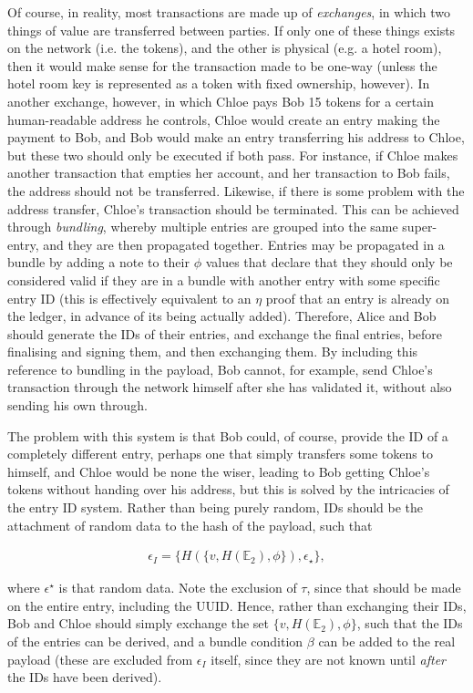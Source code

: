 \documentclass{extreport}
\begin{document}
Of course, in reality, most transactions are made up of \emph{exchanges}, in which two things of value are transferred between parties. If only one of these things exists on the network (i.e. the tokens), and the other is physical (e.g. a hotel room), then it would make sense for the transaction made to be one-way (unless the hotel room key is represented as a token with fixed ownership, however). In another exchange, however, in which Chloe pays Bob 15 tokens for a certain human-readable address he controls, Chloe would create an entry making the payment to Bob, and Bob would make an entry transferring his address to Chloe, but these two should only be executed if both pass. For instance, if Chloe makes another transaction that empties her account, and her transaction to Bob fails, the address should not be transferred. Likewise, if there is some problem with the address transfer, Chloe's transaction should be terminated. This can be achieved through \emph{bundling}, whereby multiple entries are grouped into the same super-entry, and they are then propagated together. Entries may be propagated in a bundle by adding a note to their \(\phi\) values that declare that they should only be considered valid if they are in a bundle with another entry with some specific entry ID (this is effectively equivalent to an \(\eta\) proof that an entry is already on the ledger, in advance of its being actually added). Therefore, Alice and Bob should generate the IDs of their entries, and exchange the final entries, before finalising and signing them, and then exchanging them. By including this reference to bundling in the payload, Bob cannot, for example, send Chloe's transaction through the network himself after she has validated it, without also sending his own through.

The problem with this system is that Bob could, of course, provide the ID of a completely different entry, perhaps one that simply transfers some tokens to himself, and Chloe would be none the wiser, leading to Bob getting Chloe's tokens without handing over his address, but this is solved by the intricacies of the entry ID system. Rather than being purely random, IDs should be the attachment of random data to the hash of the payload, such that

\begin{align*}
\epsilon_I = \{ H(\{ v, H(\mathbb{E}_2), \phi \}), \epsilon_\star \}, \tag{9.1}
\end{align*}

where \(\epsilon^\star\) is that random data. Note the exclusion of \(\tau\), since that should be made on the entire entry, including the UUID. Hence, rather than exchanging their IDs, Bob and Chloe should simply exchange the set \(\{ v, H(\mathbb{E}_2), \phi \}\), such that the IDs of the entries can be derived, and a bundle condition \(\beta\) can be added to the real payload (these are excluded from \(\epsilon_I\) itself, since they are not known until \emph{after} the IDs have been derived).
\end{document}
